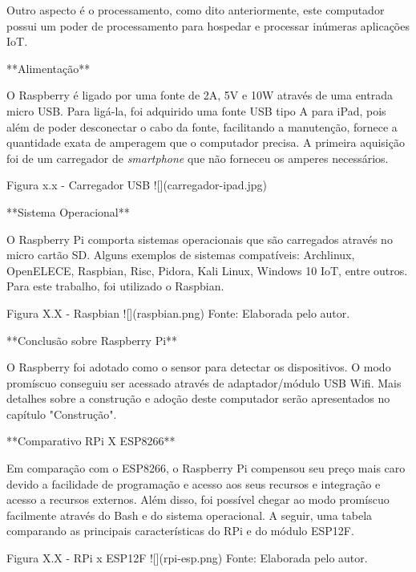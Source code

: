 Outro aspecto é o processamento, como dito anteriormente, este computador possui
um poder de processamento para hospedar e processar inúmeras aplicações IoT.

**Alimentação**

O Raspberry é ligado por uma fonte de 2A, 5V e 10W através de uma entrada micro
USB. Para ligá-la, foi adquirido uma fonte USB tipo A para iPad, pois além de
poder desconectar o cabo da fonte, facilitando a manutenção, fornece a
quantidade exata de amperagem que o computador precisa. A primeira aquisição foi
de um carregador de \emph{smartphone} que não forneceu os amperes necessários.

Figura x.x - Carregador USB
![](carregador-ipad.jpg)

**Sistema Operacional**

O Raspberry Pi comporta sistemas operacionais que são carregados através no
micro cartão SD. Alguns exemplos de sistemas compatíveis: Archlinux, OpenELECE,
Raspbian, Risc, Pidora, Kali Linux, Windows 10 IoT, entre outros. Para este
trabalho, foi utilizado o Raspbian.

Figura X.X - Raspbian
![](raspbian.png)
Fonte: Elaborada pelo autor.

**Conclusão sobre Raspberry Pi**

O Raspberry foi adotado como o sensor para detectar os dispositivos. O modo
promíscuo conseguiu ser acessado através de adaptador/módulo USB Wifi. Mais
detalhes sobre a construção e adoção deste computador serão apresentados no
capítulo "Construção".

**Comparativo RPi X ESP8266**

Em comparação com o ESP8266, o Raspberry Pi compensou seu preço mais caro devido
a facilidade de programação e acesso aos seus recursos e integração e acesso a
recursos externos. Além disso, foi possível chegar ao modo promíscuo facilmente
através do Bash e do sistema operacional. A seguir, uma tabela comparando as
principais características do RPi e do módulo ESP12F.

Figura X.X - RPi x ESP12F
![](rpi-esp.png)
Fonte: Elaborada pelo autor.
